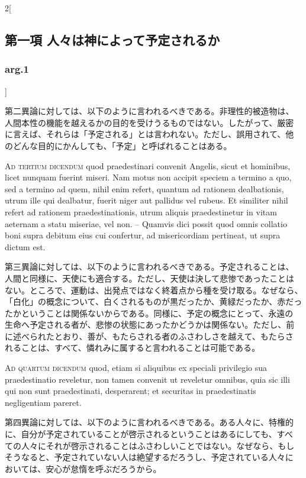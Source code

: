 \documentclass[paper=a4paper,fontsize=10pt,jafontsize=9pt,titlepage]{jlreq}
\begin{document}
\begin{paracol}{2}[\subsection{第一項 人々は神によって予定されるか}\subsubsection{arg.1}]
\switchcolumn


第二異論に対しては、以下のように言われるべきである。非理性的被造物は、
人間本性の機能を越えるかの目的を受けうるものではない。したがって、厳密
に言えば、それらは「予定される」とは言われない。ただし、誤用されて、他
のどんな目的にかんしても、「予定」と呼ばれることはある。


\switchcolumn*[\subsubsection{ad.3}]


{\scshape Ad tertium dicendum} quod praedestinari
convenit Angelis, sicut et hominibus, licet nunquam fuerint miseri. Nam
motus non accipit speciem a termino a quo, sed a termino ad quem, nihil
enim refert, quantum ad rationem dealbationis, utrum ille qui dealbatur,
fuerit niger aut pallidus vel rubeus. Et similiter nihil refert ad
rationem praedestinationis, utrum aliquis praedestinetur in vitam
aeternam a statu miseriae, vel non. -- Quamvis dici possit quod omnis
collatio boni supra debitum eius cui confertur, ad misericordiam
pertineat, ut supra dictum est.


\switchcolumn


第三異論に対しては、以下のように言われるべきである。予定されることは、
人間と同様に、天使にも適合する。ただし、天使は決して悲惨であったことは
ない。ところで、運動は、出発点ではなく終着点から種を受け取る。なぜなら、
「白化」の概念について、白くされるものが黒だったか、黄緑だったか、赤だっ
たかということは関係ないからである。同様に、予定の概念にとって、永遠の
生命へ予定される者が、悲惨の状態にあったかどうかは関係ない。ただし、前
に述べられたとおり、善が、もたらされる者のふさわしさを越えて、もたらさ
れることは、すべて、憐れみに属すると言われることは可能である。


\switchcolumn*[\subsubsection{ad.4}]


{\scshape Ad quartum dicendum} quod, etiam si aliquibus
ex speciali privilegio sua praedestinatio reveletur, non tamen convenit
ut reveletur omnibus, quia sic illi qui non sunt praedestinati,
desperarent; et securitas in praedestinatis negligentiam pareret.


\switchcolumn


第四異論に対しては、以下のように言われるべきである。ある人々に、特権的
に、自分が予定されていることが啓示されるということはあるにしても、すべ
ての人々にそれが啓示されることはふさわしいことではない。なぜなら、もし
そうなると、予定されていない人は絶望するだろうし、予定されている人々に
おいては、安心が怠惰を呼ぶだろうから。


\switchcolumn*



\end{paracol}
\newpage
\end{document}
